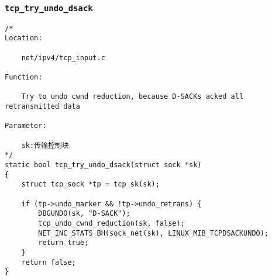         \subsubsection{\texttt{tcp_try_undo_dsack}}
\begin{verbatim}
/*
Location:

    net/ipv4/tcp_input.c

Function:

    Try to undo cwnd reduction, because D-SACKs acked all retransmitted data

Parameter:

    sk:传输控制块
*/
static bool tcp_try_undo_dsack(struct sock *sk)
{
    struct tcp_sock *tp = tcp_sk(sk);

    if (tp->undo_marker && !tp->undo_retrans) {
        DBGUNDO(sk, "D-SACK");
        tcp_undo_cwnd_reduction(sk, false);
        NET_INC_STATS_BH(sock_net(sk), LINUX_MIB_TCPDSACKUNDO);
        return true;
    }
    return false;
}
\end{verbatim}
